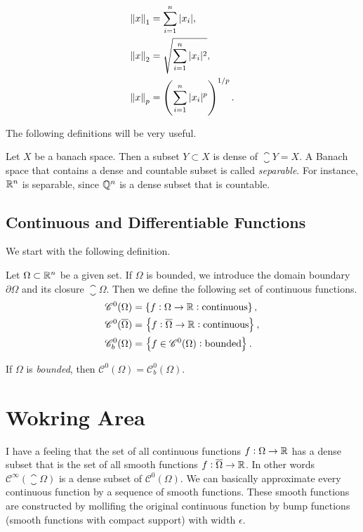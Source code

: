 \begin{align*}
  \norm{x}_{1} &= \sum_{i=1}^{n}|x_i|,\\
  \norm{x}_{2} &= \sqrt{\sum_{i=1}^{n}|x_i|^2},\\
  \norm{x}_{p} &= \left( \sum_{i=1}^{n}|x_i|^p\right)^{1/p}. 
\end{align*}


The following definitions will be very useful.

\begin{definition}
  Let $ X $ be a banach space. Then a subset $ Y \subset X $ is dense of $ \closure{Y} = X $. A Banach space that contains a dense and countable subset is called \emph{separable}. For instance, $ \mathbb{R}^n $ is separable, since $ \mathbb{Q}^n $ is a dense subset that is countable. 
\end{definition}

\subsection{Continuous and Differentiable Functions}
We start with the following definition.

\begin{definition}
  Let $ \Omega \subset \mathbb{R}^n $ be a given set. If $ \Omega $ is bounded, we introduce the domain boundary $ \partial \Omega $ and its closure $ \closure{\Omega} $. Then we define the following set of continuous functions.
  \begin{align*}
    \mathscr{C}^0(\Omega) &= \left\{  f: \Omega \to \mathbb{R}: \text{continuous}   \right\},\\
    \mathscr{C}^0(\overline{\Omega}) &= \left\{  f: \overline{\Omega} \to \mathbb{R}: \text{continuous}  \right\},\\
    \mathscr{C}^0_b(\Omega) &= \left\{  f \in \mathscr{C}^0(\Omega): \text{bounded}  \right\}.
  \end{align*}
\end{definition}

\begin{remark}
  If $ \Omega $ is \textit{bounded}, then $ \mathscr{C}^{0}(\Omega) = \mathscr{C}^{0}_b(\Omega) $.
\end{remark}





\section{Wokring Area}


\begin{observation}
I have a feeling that the set of all continuous functions $ f: \Omega \to \mathbb{R} $ has a dense subset that is the set of all smooth functions $ f: \overline{\Omega} \to \mathbb{R}  $. In other words $ \mathscr{C}^{\infty}(\closure{\Omega}) $ is a dense subset of $ \mathscr{C}^{0}(\Omega) $. We can basically approximate every continuous function by a sequence of smooth functions. These smooth functions are constructed by mollifing the original continuous function by bump functions (smooth functions with compact support) with width $ \epsilon $.
\end{observation}



\newpage
